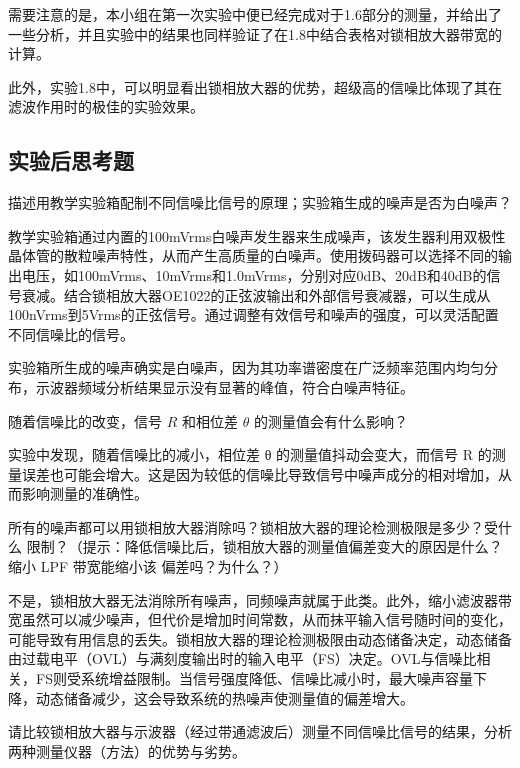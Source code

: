 \documentclass[dvipsnames, svgnames,a4paper,11pt]{article}
\begin{document}
	需要注意的是，本小组在第一次实验中便已经完成对于1.6部分的测量，并给出了一些分析，并且实验中的结果也同样验证了在1.8中结合表格对锁相放大器带宽的计算。

	此外，实验1.8中，可以明显看出锁相放大器的优势，超级高的信噪比体现了其在滤波作用时的极佳的实验效果。

	
	
	
	\subsection{实验后思考题}
	
	\begin{question}
		描述用教学实验箱配制不同信噪比信号的原理；实验箱生成的噪声是否为白噪声？
		\end{question}
		教学实验箱通过内置的100mVrms白噪声发生器来生成噪声，该发生器利用双极性晶体管的散粒噪声特性，从而产生高质量的白噪声。使用拨码器可以选择不同的输出电压，如100mVrms、10mVrms和1.0mVrms，分别对应0dB、20dB和40dB的信号衰减。结合锁相放大器OE1022的正弦波输出和外部信号衰减器，可以生成从100nVrms到5Vrms的正弦信号。通过调整有效信号和噪声的强度，可以灵活配置不同信噪比的信号。
		
		实验箱所生成的噪声确实是白噪声，因为其功率谱密度在广泛频率范围内均匀分布，示波器频域分析结果显示没有显著的峰值，符合白噪声特征。
	\begin{question}
		随着信噪比的改变，信号 $R$ 和相位差 $\theta$ 的测量值会有什么影响？
	\end{question}
	实验中发现，随着信噪比的减小，相位差 θ 的测量值抖动会变大，而信号 R 的测量误差也可能会增大。这是因为较低的信噪比导致信号中噪声成分的相对增加，从而影响测量的准确性。
	\begin{question}
		所有的噪声都可以用锁相放大器消除吗？锁相放大器的理论检测极限是多少？受什么
限制？（提示：降低信噪比后，锁相放大器的测量值偏差变大的原因是什么？缩小 LPF 带宽能缩小该
偏差吗？为什么？）
	\end{question}
	不是，锁相放大器无法消除所有噪声，同频噪声就属于此类。此外，缩小滤波器带宽虽然可以减少噪声，但代价是增加时间常数，从而抹平输入信号随时间的变化，可能导致有用信息的丢失。锁相放大器的理论检测极限由动态储备决定，动态储备由过载电平（OVL）与满刻度输出时的输入电平（FS）决定。OVL与信噪比相关，FS则受系统增益限制。当信号强度降低、信噪比减小时，最大噪声容量下降，动态储备减少，这会导致系统的热噪声使测量值的偏差增大。
	
	\begin{question}
		请比较锁相放大器与示波器（经过带通滤波后）测量不同信噪比信号的结果，分析两种测量仪器（方法）的优势与劣势。
		\end{question}
		
\end{document}
